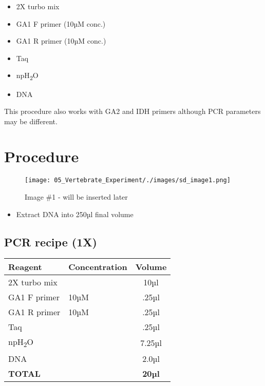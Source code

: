 \documentclass[
  letterpaper,
  DIV=11,
  numbers=noendperiod]{scrreprt}
\providecommand{\tightlist}{%
  \setlength{\itemsep}{0pt}\setlength{\parskip}{0pt}}\usepackage{longtable,booktabs,array}
\begin{document}
\begin{itemize}
\tightlist
\item
  2X turbo mix
\item
  GA1 F primer (10µM conc.)
\item
  GA1 R primer (10µM conc.)
\item
  Taq
\item
  npH\textsubscript{2}O
\item
  DNA
\end{itemize}

This procedure also works with GA2 and IDH primers although PCR
parameters may be different.

\hypertarget{procedure-55}{%
\section{Procedure}\label{procedure-55}}

\begin{figure}

{\centering \texttt{[image: 05\_Vertebrate\_Experiment/./images/sd\_image1.png]}

}

\caption{Image \#1 - will be inserted later}

\end{figure}

\begin{itemize}
\tightlist
\item
  Extract DNA into 250µl final volume
\end{itemize}

\hypertarget{pcr-recipe-1x}{%
\subsection{PCR recipe (1X)}\label{pcr-recipe-1x}}

\begin{longtable}[]{@{}llc@{}}
\toprule\noalign{}
Reagent & Concentration & Volume \\
\midrule\noalign{}
\endhead
\bottomrule\noalign{}
\endlastfoot
2X turbo mix & & 10µl \\
GA1 F primer & 10µM & .25µl \\
GA1 R primer & 10µM & .25µl \\
Taq & & .25µl \\
npH\textsubscript{2}O & & 7.25µl \\
DNA & & 2.0µl \\
\textbf{TOTAL} & & \textbf{20µl} \\
\end{longtable}
\end{document}
